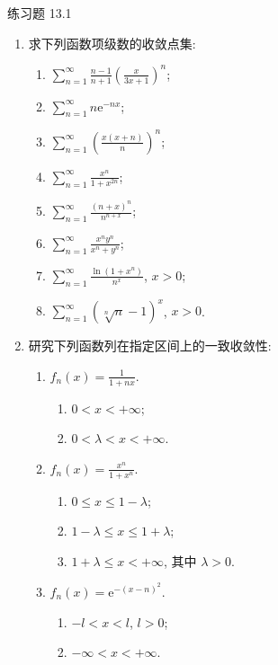 \begin{exblock}{练习题 13.1}
\begin{enumerate}
  \item 求下列函数项级数的收敛点集:
  \begin{enumerate}
    \item $\displaystyle\sum_{n=1}^{\infty}\frac{n-1}{n+1}\left(\frac{x}{3x+1}\right)^{n}$;
    \item $\displaystyle\sum_{n=1}^{\infty}n\mathrm{e}^{-nx}$;
    \item $\displaystyle\sum_{n=1}^{\infty}\left(\frac{x(x+n)}{n}\right)^{n}$;
    \item $\displaystyle\sum_{n=1}^{\infty}\frac{x^{n}}{1+x^{2n}}$;
    \item $\displaystyle\sum_{n=1}^{\infty}\frac{(n+x)^{n}}{n^{n+x}}$;
    \item $\displaystyle\sum_{n=1}^{\infty}\frac{x^{n}y^{n}}{x^{n}+y^{n}}$;
    \item $\displaystyle\sum_{n=1}^{\infty}\frac{\ln(1+x^{n})}{n^{x}}$, $x>0$;
    \item $\displaystyle\sum_{n=1}^{\infty}(\sqrt[n]{n}-1)^{x}$, $x>0$.
  \end{enumerate}
  \item 研究下列函数列在指定区间上的一致收敛性:
  \begin{enumerate}
    \item $f_{n}(x)=\frac{1}{1+nx}$.
    \begin{enumerate}
      \item $0<x<+\infty$;
      \item $0<\lambda<x<+\infty$.
    \end{enumerate}
    \item $f_{n}(x)=\frac{x^{n}}{1+x^{n}}$.
    \begin{enumerate}
      \item $0\leqslant x\leqslant1-\lambda$;
      \item $1-\lambda\leqslant x\leqslant1+\lambda$;
      \item $1+\lambda\leqslant x<+\infty$, 其中 $\lambda>0$.
    \end{enumerate}
    \item $f_{n}(x)=\mathrm{e}^{-(x-n)^{2}}$.
    \begin{enumerate}
      \item $-l<x<l$, $l>0$;
      \item $-\infty<x<+\infty$.
    \end{enumerate}
  \end{enumerate}

\end{enumerate}
\end{exblock}
